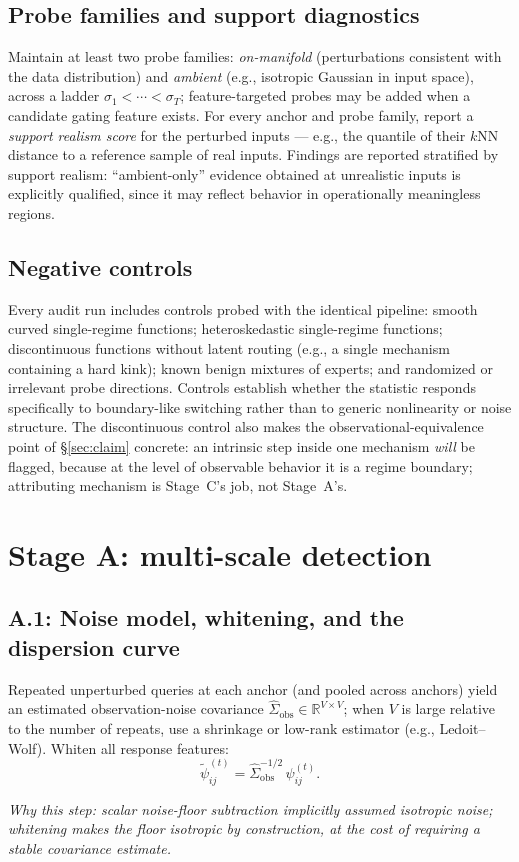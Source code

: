 \documentclass[11pt]{article}
\newcommand{\R}{\mathbb{R}}
\newcommand{\why}[1]{\par\noindent\textcolor{muted}{\small\itshape Why this step: #1}}
\begin{document}
\subsection{Probe families and support diagnostics}
\label{sec:support}

Maintain at least two probe families: \emph{on-manifold} (perturbations consistent with the
data distribution) and \emph{ambient} (e.g., isotropic Gaussian in input space), across a
ladder \(\sigma_1<\cdots<\sigma_T\); feature-targeted probes may be added when a candidate
gating feature exists. For every anchor and probe family, report a \emph{support realism
score} for the perturbed inputs --- e.g., the quantile of their \(k\)NN distance to a
reference sample of real inputs. Findings are reported stratified by support realism:
``ambient-only'' evidence obtained at unrealistic inputs is explicitly qualified, since it may
reflect behavior in operationally meaningless regions.

\subsection{Negative controls}
\label{sec:controls}

Every audit run includes controls probed with the identical pipeline:
smooth curved single-regime functions; heteroskedastic single-regime functions;
discontinuous functions without latent routing (e.g., a single mechanism containing a hard
kink); known benign mixtures of experts; and randomized or irrelevant probe directions.
Controls establish whether the statistic responds specifically to boundary-like switching
rather than to generic nonlinearity or noise structure. The discontinuous control also makes
the observational-equivalence point of \S\ref{sec:claim} concrete: an intrinsic step inside
one mechanism \emph{will} be flagged, because at the level of observable behavior it is a
regime boundary; attributing mechanism is Stage~C's job, not Stage~A's.

\section{Stage A: multi-scale detection}

\subsection{A.1: Noise model, whitening, and the dispersion curve}
\label{sec:whiten}

Repeated unperturbed queries at each anchor (and pooled across anchors) yield an estimated
observation-noise covariance \(\widehat\Sigma_{\mathrm{obs}}\in\R^{V\times V}\); when \(V\) is
large relative to the number of repeats, use a shrinkage or low-rank estimator
(e.g., Ledoit--Wolf). Whiten all response features:
\[
  \tilde\psi_{ij}^{(t)}=\widehat\Sigma_{\mathrm{obs}}^{-1/2}\,\psi_{ij}^{(t)} .
\]
\why{scalar noise-floor subtraction implicitly assumed isotropic noise; whitening makes the
floor isotropic by construction, at the cost of requiring a stable covariance estimate.}
\end{document}
